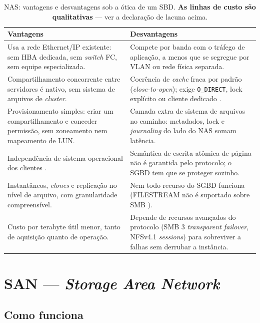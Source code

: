\documentclass[11pt,a4paper]{article}
\begin{document}
\begin{table}[H]
\centering
\caption{NAS: vantagens e desvantagens sob a ótica de um SBD. \textbf{As linhas de custo são
qualitativas} --- ver a declaração de lacuna acima.}
\label{tab:vantnas}
{\footnotesize
\begin{tabular}{@{}p{7.4cm}p{7.4cm}@{}}
\toprule
\textbf{Vantagens} & \textbf{Desvantagens} \\
\midrule
Usa a rede Ethernet/IP existente: sem HBA dedicada, sem \textit{switch} FC, sem equipe
especializada. & Compete por banda com o tráfego de aplicação, a menos que se segregue por VLAN ou
rede física separada. \\
Compartilhamento concorrente entre servidores é nativo, sem sistema de arquivos de
\textit{cluster}. & Coerência de \textit{cache} fraca por padrão (\textit{close-to-open}); exige
\texttt{O\_DIRECT}, lock explícito ou cliente dedicado \cite{nfsman}. \\
Provisionamento simples: criar um compartilhamento e conceder permissão, sem zoneamento nem
mapeamento de LUN. & Camada extra de sistema de arquivos no caminho: metadados, lock e
\textit{journaling} do lado do NAS somam latência. \\
Independência de sistema operacional dos clientes \cite{elmasri2018}. & Semântica de escrita
atômica de página não é garantida pelo protocolo; o SGBD tem que se proteger sozinho. \\
Instantâneos, \textit{clones} e replicação no nível de arquivo, com granularidade compreensível. &
Nem todo recurso do SGBD funciona (FILESTREAM não é suportado sobre SMB \cite{mssqlsmb}). \\
Custo por terabyte útil menor, tanto de aquisição quanto de operação. & Depende de recursos
avançados do protocolo (SMB 3 \textit{transparent failover}, NFSv4.1 \textit{sessions}) para
sobreviver a falhas sem derrubar a instância. \\
\bottomrule
\end{tabular}}
\end{table}

\section{SAN --- \textit{Storage Area Network}}
\label{sec:san}

\subsection{Como funciona}
\end{document}
